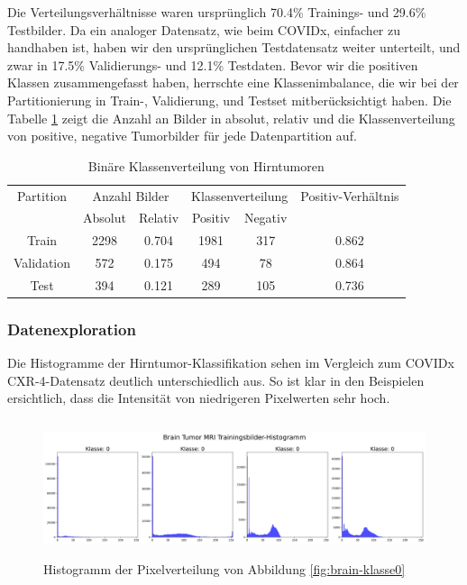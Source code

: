 Die Verteilungsverhältnisse waren ursprünglich 70.4\% Trainings- und 29.6\% Testbilder. Da ein analoger Datensatz, wie beim COVIDx, einfacher zu handhaben ist, haben wir den ursprünglichen Testdatensatz weiter unterteilt, und zwar in 17.5\% Validierungs- und 12.1\% Testdaten. Bevor wir die positiven Klassen zusammengefasst haben, herrschte eine Klassenimbalance, die wir bei der Partitionierung in Train-, Validierung, und Testset mitberücksichtigt haben. Die Tabelle \ref{tab:mri-binaere-klassenverteilung} zeigt die Anzahl an Bilder in absolut, relativ und die Klassenverteilung von positive, negative Tumorbilder für jede Datenpartition auf.

\begin{table}[ht]
\centering
\begin{tabular}{@{}cccccc@{}}
\toprule
Partition & \multicolumn{2}{c}{Anzahl Bilder} & \multicolumn{2}{c}{Klassenverteilung} & Positiv-Verhältnis\\ 
\cmidrule(lr){2-3} \cmidrule(lr){4-5} 
           & Absolut & Relativ & Positiv & Negativ \\ 
\midrule
Train      & 2298 & 0.704 & 1981 & 317 & 0.862 \\
Validation & 572  & 0.175 & 494  & 78  & 0.864 \\
Test       & 394  & 0.121 & 289  & 105 & 0.736 \\ 
\bottomrule
\end{tabular}
\caption{Binäre Klassenverteilung von Hirntumoren}
\label{tab:mri-binaere-klassenverteilung}
\end{table}

\subsubsection{Datenexploration}

Die Histogramme der Hirntumor-Klassifikation sehen im Vergleich zum COVIDx CXR-4-Datensatz deutlich unterschiedlich aus. So ist klar in den Beispielen ersichtlich, dass die Intensität von niedrigeren Pixelwerten sehr hoch.

\begin{figure}[ht]
    \centering
    \includegraphics[width=\linewidth, height=4cm]{01-images/03-data/brain-klasse0-hist.png}
    \caption{Histogramm der Pixelverteilung von Abbildung \ref{fig:brain-klasse0}}
    \label{fig:brain-klasse0-hist}
\end{figure}

